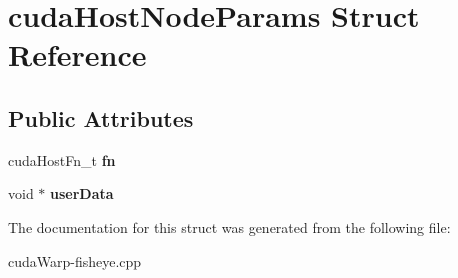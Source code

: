 \hypertarget{structcudaHostNodeParams}{}\section{cuda\+Host\+Node\+Params Struct Reference}
\label{structcudaHostNodeParams}
\subsection*{Public Attributes}
\begin{DoxyCompactItemize}
\item 
cuda\+Host\+Fn\+\_\+t {\bfseries fn}\hypertarget{structcudaHostNodeParams_a429c10b250891334d8bf4848402c8fed}{}\label{structcudaHostNodeParams_a429c10b250891334d8bf4848402c8fed}

\item 
void $\ast$ {\bfseries user\+Data}\hypertarget{structcudaHostNodeParams_ac59f34f70056707191c7c3a8d4df225d}{}\label{structcudaHostNodeParams_ac59f34f70056707191c7c3a8d4df225d}

\end{DoxyCompactItemize}


The documentation for this struct was generated from the following file\+:\begin{DoxyCompactItemize}
\item 
cuda\+Warp-\/fisheye.\+cpp\end{DoxyCompactItemize}

